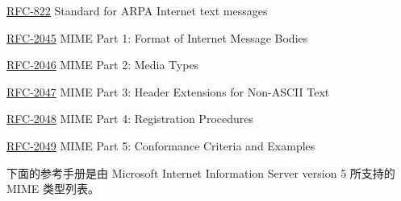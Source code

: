 \begin{compactitem}
\item \href{http://www.rfc-editor.org/rfc/rfc822.txt}{RFC-822} Standard for ARPA Internet text messages
\item \href{http://www.rfc-editor.org/rfc/rfc2045.txt}{RFC-2045} MIME Part 1: Format of Internet Message Bodies
\item \href{http://www.rfc-editor.org/rfc/rfc2046.txt}{RFC-2046} MIME Part 2: Media Types
\item \href{http://www.rfc-editor.org/rfc/rfc2047.txt}{RFC-2047} MIME Part 3: Header Extensions for Non-ASCII Text
\item \href{http://www.rfc-editor.org/rfc/rfc2048.txt}{RFC-2048} MIME Part 4: Registration Procedures
\item \href{http://www.rfc-editor.org/rfc/rfc2049.txt}{RFC-2049} MIME Part 5: Conformance Criteria and Examples
\end{compactitem}

下面的参考手册是由 Microsoft Internet Information Server version 5 所支持的 MIME 类型列表。


